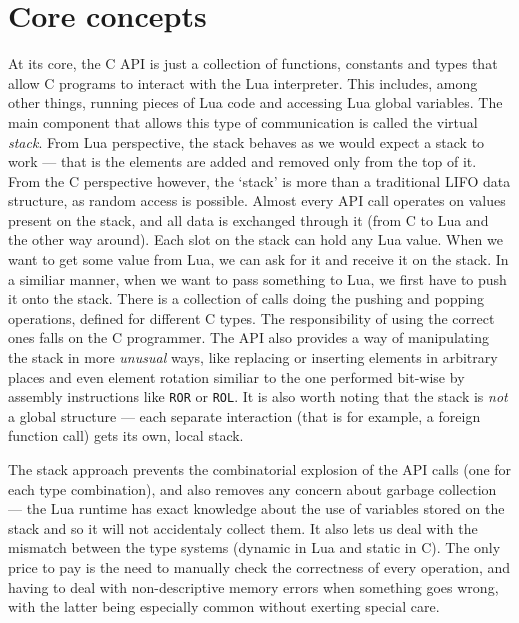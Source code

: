 \documentclass[polish, english]{iithesis}
\begin{document}
  \section{Core concepts}
    At its core, the C API is just a collection of functions, constants and types that allow C programs to interact with the Lua interpreter.
    This includes, among other things, running pieces of Lua code and accessing Lua global variables.
    The main component that allows this type of communication is called the virtual \textit{stack}.
    From Lua perspective, the stack behaves as we would expect a stack to work --- that is the elements are added and removed only from the top of it.
    From the C perspective however, the `stack' is more than a traditional LIFO data structure, as random access is possible. 
    Almost every API call operates on values present on the stack, and all data is exchanged through it (from C to Lua and the other way around).  
    Each slot on the stack can hold any Lua value.
    When we want to get some value from Lua, we can ask for it and receive it on the stack.
    In a similiar manner, when we want to pass something to Lua, we first have to push it onto the stack.
    There is a collection of calls doing the pushing and popping operations, defined for different C types.
    The responsibility of using the correct ones falls on the C programmer.
    The API also provides a way of manipulating the stack in more \textit{unusual} ways, like replacing or inserting elements in arbitrary places and even element rotation similiar to the one performed bit-wise by assembly instructions like \texttt{ROR} or \texttt{ROL}.
    It is also worth noting that the stack is \emph{not} a global structure --- each separate interaction (that is for example, a foreign function call) gets its own, local stack.

    The stack approach prevents the combinatorial explosion of the API calls (one for each type combination), and also removes any concern about garbage collection --- the Lua runtime has exact knowledge about the use of variables stored on the stack and so it will not accidentaly collect them.
    It also lets us deal with the mismatch between the type systems (dynamic in Lua and static in C).
    The only price to pay is the need to manually check the correctness of every operation, and having to deal with non-descriptive memory errors when something goes wrong, with the latter being especially common without exerting special care.
\end{document}
